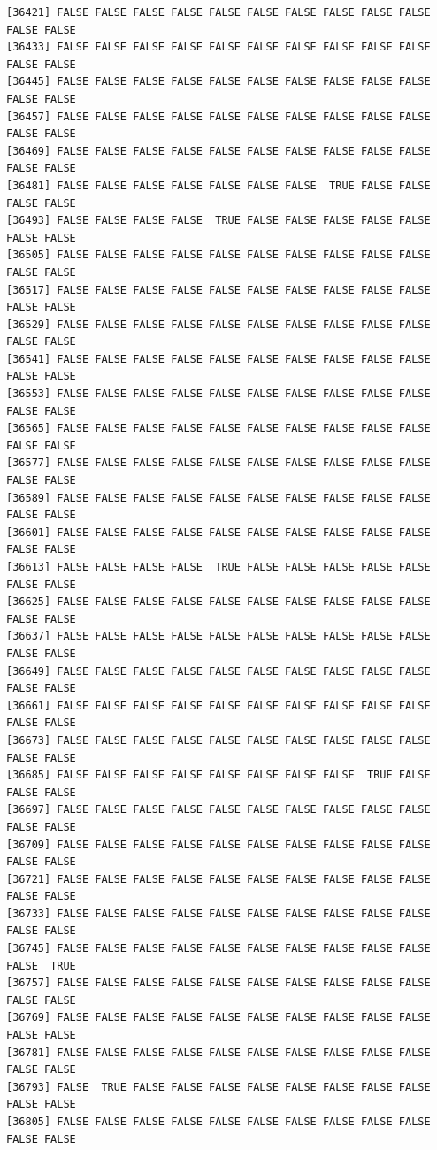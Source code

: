\documentclass[
  a4paper,
  DIV=11,
  numbers=noendperiod]{scrartcl}
\begin{document}
\begin{verbatim}
[36421] FALSE FALSE FALSE FALSE FALSE FALSE FALSE FALSE FALSE FALSE FALSE FALSE
[36433] FALSE FALSE FALSE FALSE FALSE FALSE FALSE FALSE FALSE FALSE FALSE FALSE
[36445] FALSE FALSE FALSE FALSE FALSE FALSE FALSE FALSE FALSE FALSE FALSE FALSE
[36457] FALSE FALSE FALSE FALSE FALSE FALSE FALSE FALSE FALSE FALSE FALSE FALSE
[36469] FALSE FALSE FALSE FALSE FALSE FALSE FALSE FALSE FALSE FALSE FALSE FALSE
[36481] FALSE FALSE FALSE FALSE FALSE FALSE FALSE  TRUE FALSE FALSE FALSE FALSE
[36493] FALSE FALSE FALSE FALSE  TRUE FALSE FALSE FALSE FALSE FALSE FALSE FALSE
[36505] FALSE FALSE FALSE FALSE FALSE FALSE FALSE FALSE FALSE FALSE FALSE FALSE
[36517] FALSE FALSE FALSE FALSE FALSE FALSE FALSE FALSE FALSE FALSE FALSE FALSE
[36529] FALSE FALSE FALSE FALSE FALSE FALSE FALSE FALSE FALSE FALSE FALSE FALSE
[36541] FALSE FALSE FALSE FALSE FALSE FALSE FALSE FALSE FALSE FALSE FALSE FALSE
[36553] FALSE FALSE FALSE FALSE FALSE FALSE FALSE FALSE FALSE FALSE FALSE FALSE
[36565] FALSE FALSE FALSE FALSE FALSE FALSE FALSE FALSE FALSE FALSE FALSE FALSE
[36577] FALSE FALSE FALSE FALSE FALSE FALSE FALSE FALSE FALSE FALSE FALSE FALSE
[36589] FALSE FALSE FALSE FALSE FALSE FALSE FALSE FALSE FALSE FALSE FALSE FALSE
[36601] FALSE FALSE FALSE FALSE FALSE FALSE FALSE FALSE FALSE FALSE FALSE FALSE
[36613] FALSE FALSE FALSE FALSE  TRUE FALSE FALSE FALSE FALSE FALSE FALSE FALSE
[36625] FALSE FALSE FALSE FALSE FALSE FALSE FALSE FALSE FALSE FALSE FALSE FALSE
[36637] FALSE FALSE FALSE FALSE FALSE FALSE FALSE FALSE FALSE FALSE FALSE FALSE
[36649] FALSE FALSE FALSE FALSE FALSE FALSE FALSE FALSE FALSE FALSE FALSE FALSE
[36661] FALSE FALSE FALSE FALSE FALSE FALSE FALSE FALSE FALSE FALSE FALSE FALSE
[36673] FALSE FALSE FALSE FALSE FALSE FALSE FALSE FALSE FALSE FALSE FALSE FALSE
[36685] FALSE FALSE FALSE FALSE FALSE FALSE FALSE FALSE  TRUE FALSE FALSE FALSE
[36697] FALSE FALSE FALSE FALSE FALSE FALSE FALSE FALSE FALSE FALSE FALSE FALSE
[36709] FALSE FALSE FALSE FALSE FALSE FALSE FALSE FALSE FALSE FALSE FALSE FALSE
[36721] FALSE FALSE FALSE FALSE FALSE FALSE FALSE FALSE FALSE FALSE FALSE FALSE
[36733] FALSE FALSE FALSE FALSE FALSE FALSE FALSE FALSE FALSE FALSE FALSE FALSE
[36745] FALSE FALSE FALSE FALSE FALSE FALSE FALSE FALSE FALSE FALSE FALSE  TRUE
[36757] FALSE FALSE FALSE FALSE FALSE FALSE FALSE FALSE FALSE FALSE FALSE FALSE
[36769] FALSE FALSE FALSE FALSE FALSE FALSE FALSE FALSE FALSE FALSE FALSE FALSE
[36781] FALSE FALSE FALSE FALSE FALSE FALSE FALSE FALSE FALSE FALSE FALSE FALSE
[36793] FALSE  TRUE FALSE FALSE FALSE FALSE FALSE FALSE FALSE FALSE FALSE FALSE
[36805] FALSE FALSE FALSE FALSE FALSE FALSE FALSE FALSE FALSE FALSE FALSE FALSE

\end{verbatim}
\end{document}

